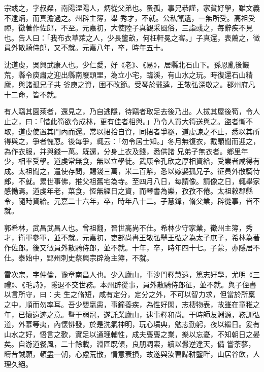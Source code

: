 \begin{pinyinscope}
 宗彧之，字叔粲，南陽涅陽人，炳從父弟也。蚤孤，事兄恭謹，家貧好學，雖文義不逮炳，而真澹過之。州辟主簿，舉
 秀才，不就。公私餼遺，一無所受。高祖受禪，徵著作佐郎，不至。元嘉初，大使陸子真觀采風俗，三詣彧之，每辭疾不見也。告人曰：「我布衣草萊之人，少長壟畝，何枉軒冕之客。」子真還，表薦之，徵員外散騎侍郎，又不就。元嘉八年，卒，時年五十。



 沈道虔，吳興武康人也。少仁愛，好《老》、《易》，居縣北石山下。孫恩亂後饑荒，縣令庾肅之迎出縣南廢頭里，為立小宅，臨溪，有山水之玩。時復還石山精廬，與諸孤兄子共
 釜庾之資，困不改節。受琴於戴逵，王敬弘深敬之。郡州府凡十二命，皆不就。



 有人竊其園萊者，還見之，乃自逃隱，待竊者取足去後乃出。人拔其屋後筍，令人止之，曰：「惜此筍欲令成林，更有佳者相與。」乃令人買大筍送與之。盜者慚不取，道虔使置其門內而還。常以捃拾自資，同捃者爭穟，道虔諫之不止，悉以其所得與之，爭者愧恧。後每爭，輒云：「勿令居士知。」冬月無復衣，戴顒聞而迎之，為作衣服，并與錢一萬。既還，分身上衣及錢，悉供諸
 兄弟子無衣者。鄉里年少，相率受學。道虔常無食，無以立學徒。武康令孔欣之厚相資給，受業者咸得有成。太祖聞之，遣使存問，賜錢三萬，米二百斛，悉以嫁娶孤兄子。征員外散騎侍郎，不就。累世事佛，推父祖舊宅為寺。至四月八日，每請像。請像之日，輒舉家感慟焉。道虔年老，菜食，恆無經日之資，而琴書為樂，孜孜不倦。太祖敕郡縣令，隨時資給。元嘉二十六年，卒，時年八十二。子慧鋒，脩父業，辟從事，皆不就。



 郭希林，武昌武昌人也。曾祖翻，晉世高尚不仕。希林少守家業，徵州主簿，秀才，衛軍參軍，並不就。元嘉初，吏部尚書王敬弘舉王弘之為太子庶子，希林為著作佐郎。後又徵員外散騎侍郎，並不就。十年，卒，時年四十七。子蒙，亦隱居不仕。泰始中，郢州刺史蔡興宗辟為主簿，不就。



 雷次宗，字仲倫，豫章南昌人也。少入廬山，事沙門釋慧遠，篤志好學，尤明《三禮》、《毛詩》，隱退不交世務。本州辟從事，員外散騎侍郎征，並不就。與子侄書以言所守，曰：夫
 生之脩短，咸有定分，定分之外，不可以智力求，但當於所稟之中，順而勿率耳。吾少嬰羸患，事鐘養疾，為性好閑，志棲物表，故雖在童稚之年，已懷遠迹之意。暨于弱冠，遂託業廬山，逮事釋和尚。于時師友淵源，務訓弘道，外慕等夷，內懷悱發，於是洗氣神明，玩心墳典，勉志勤躬，夜以繼日。爰有山水之好，悟言之歡，實足以通理輔性，成夫亹亹之業，樂以忘憂，不知朝日之晏矣。自游道餐風，二十餘載，淵匠既傾，良朋凋索，續以釁逆違天，備
 嘗荼蓼，疇昔誠願，頓盡一朝，心慮荒散，情意衰損，故遂與汝曹歸耕壟畔，山居谷飲，人理久絕。




\end{pinyinscope}
